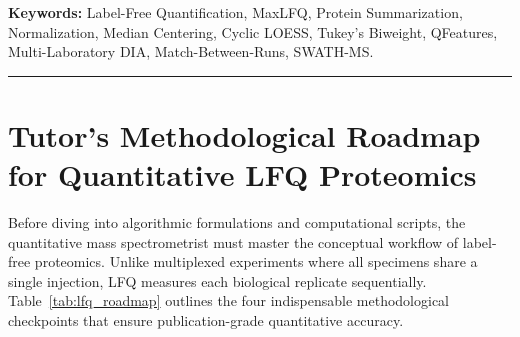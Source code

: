 \documentclass[11pt,oneside]{book}
\begin{document}
\noindent
\textbf{Keywords:} Label-Free Quantification, MaxLFQ, Protein Summarization, Normalization, Median Centering, Cyclic LOESS, Tukey's Biweight, QFeatures, Multi-Laboratory DIA, Match-Between-Runs, SWATH-MS.

\vspace{1em}
\noindent\rule{\textwidth}{0.8pt}

\section{Tutor's Methodological Roadmap for Quantitative LFQ Proteomics}

Before diving into algorithmic formulations and computational scripts, the quantitative mass spectrometrist must master the conceptual workflow of label-free proteomics. Unlike multiplexed experiments where all specimens share a single injection, LFQ measures each biological replicate sequentially. Table~\ref{tab:lfq_roadmap} outlines the four indispensable methodological checkpoints that ensure publication-grade quantitative accuracy.
\end{document}
